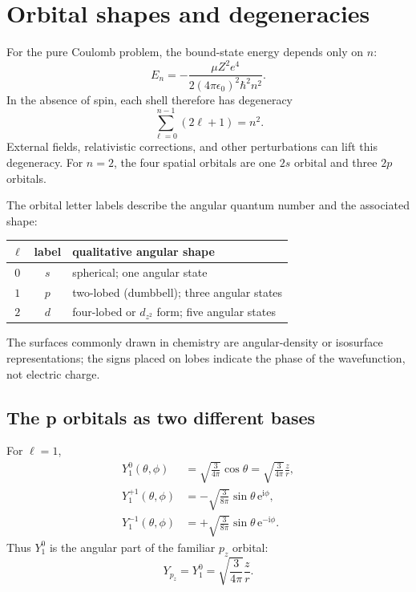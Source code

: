 \documentclass[11pt]{article}
\newcommand{\ee}{\mathrm{e}}
\newcommand{\ii}{\mathrm{i}}
\begin{document}
\section{Orbital shapes and degeneracies}

For the pure Coulomb problem, the bound-state energy depends only on $n$:
\begin{equation}
  E_n=-\frac{\mu Z^2e^4}{2(4\pi\epsilon_0)^2\hbar^2n^2}.
\end{equation}
In the absence of spin, each shell therefore has degeneracy
\begin{equation}
  \sum_{\ell=0}^{n-1}(2\ell+1)=n^2.
\end{equation}
External fields, relativistic corrections, and other perturbations can lift this
degeneracy.  For $n=2$, the four spatial orbitals are one $2s$ orbital and three
$2p$ orbitals.

The orbital letter labels describe the angular quantum number and the associated
shape:
\begin{center}
\begin{tabular}{ccl}
  $\ell$ & label & qualitative angular shape\\ \hline
  $0$ & $s$ & spherical; one angular state\\
  $1$ & $p$ & two-lobed (dumbbell); three angular states\\
  $2$ & $d$ & four-lobed or $d_{z^2}$ form; five angular states
\end{tabular}
\end{center}
The surfaces commonly drawn in chemistry are angular-density or isosurface
representations; the signs placed on lobes indicate the phase of the wavefunction,
not electric charge.

\subsection{The p orbitals as two different bases}

For $\ell=1$,
\begin{align}
  Y_1^0(\theta,\phi)
  &=\sqrt{\frac{3}{4\pi}}\cos\theta
   =\sqrt{\frac{3}{4\pi}}\frac{z}{r},\\
  Y_1^{+1}(\theta,\phi)
  &=-\sqrt{\frac{3}{8\pi}}\sin\theta\,\ee^{\ii\phi},\\
  Y_1^{-1}(\theta,\phi)
  &=+\sqrt{\frac{3}{8\pi}}\sin\theta\,\ee^{-\ii\phi}.
\end{align}
Thus $Y_1^0$ is the angular part of the familiar $p_z$ orbital:
\begin{equation}
  \boxed{Y_{p_z}=Y_1^0=\sqrt{\frac{3}{4\pi}}\frac{z}{r}}.
\end{equation}
\end{document}
